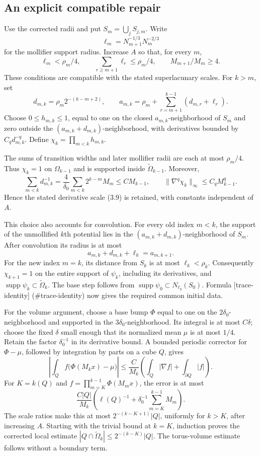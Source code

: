 \documentclass[10pt]{article}
\begin{document}
\subsection*{An explicit compatible repair}
Use the corrected radii and put \(S_m=\bigcup_jS_{j,m}\). Write \[\ell_m=N_{m+1}^{-1/3}N_m^{-2/3}\] for the mollifier support radius. Increase \(A\) so that, for every \(m\), \[\ell_m<\rho_m/4,\qquad
 \sum_{r\geq m+1}\ell_r\leq\rho_m/4,\qquad
 M_{m+1}/M_m\geq4.\] These conditions are compatible with the stated superlacunary scales. For \(k>m\), set \[d_{m,k}=\rho_m2^{-(k-m+2)},\qquad
 a_{m,k}=\rho_m+\sum_{r=m+1}^{k-1}(d_{m,r}+\ell_r).\] Choose \(0\leq h_{m,k}\leq1\), equal to one on the closed \(a_{m,k}\)-neighborhood of \(S_m\) and zero outside the \((a_{m,k}+d_{m,k})\)-neighborhood, with derivatives bounded by \(C_qd_{m,k}^{-q}\). Define \(\chi_k=\prod_{m<k}h_{m,k}\).\par
The sums of transition widths and later mollifier radii are each at most \(\rho_m/4\). Thus \(\chi_k=1\) on \(\Omega_{k-1}\) and is supported inside \(\widetilde\Omega_{k-1}\). Moreover, \[\sum_{m<k}d_{m,k}^{-1}
 =\frac4{\delta_0}\sum_{m<k}2^{k-m}M_m
 \leq C M_{k-1},
 \qquad
 \|\nabla^q\chi_k\|_\infty\leq C_qM_{k-1}^q.\] Hence the stated derivative scale (3.9) is retained, with constants independent of \(A\).\par
This choice also accounts for convolution. For every old index \(m<k\), the support of the unmollified \(k\)th potential lies in the \((a_{m,k}+d_{m,k})\)-neighborhood of \(S_m\). After convolution its radius is at most \[a_{m,k}+d_{m,k}+\ell_k=a_{m,k+1}.\] For the new index \(m=k\), its distance from \(S_k\) is at most \(\ell_k<\rho_k\). Consequently \(\chi_{k+1}=1\) on the entire support of \(\psi_k\), including its derivatives, and \(\operatorname{supp}\psi_k\subset\widetilde\Omega_k\). The base step follows from \(\operatorname{supp}\psi_0\subset N_{\ell_0}(S_0)\). Formula [trace-identity] (\#trace-identity) now gives the required common initial data.\par
For the volume argument, choose a base bump \(\Phi\) equal to one on the \(2\delta_0\)-neighborhood and supported in the \(3\delta_0\)-neighborhood. Its integral is at most \(C\delta\); choose the fixed \(\delta\) small enough that its normalized mean \(\mu\) is at most \(1/4\). Retain the factor \(\delta_0^{-1}\) in its derivative bound. A bounded periodic corrector for \(\Phi-\mu\), followed by integration by parts on a cube \(Q\), gives \[\left|\int_Q f\bigl(\Phi(M_kx)-\mu\bigr)\right|
 \leq \frac C{M_k}\left(\int_Q|\nabla f|+\int_{\partial Q}|f|\right).\] For \(K=k(Q)\) and \(f=\prod_{m=K}^{k-1}\Phi(M_mx)\), the error is at most \[\frac{C|Q|}{M_k}
 \left(\ell(Q)^{-1}+\delta_0^{-1}\sum_{m=K}^{k-1}M_m\right).\] The scale ratios make this at most \(2^{-(k-K+1)}|Q|\), uniformly for \(k>K\), after increasing \(A\). Starting with the trivial bound at \(k=K\), induction proves the corrected local estimate \(|Q\cap\widetilde\Omega_k|\leq2^{-(k-K)}|Q|\). The torus-volume estimate follows without a boundary term.\par
\end{document}
